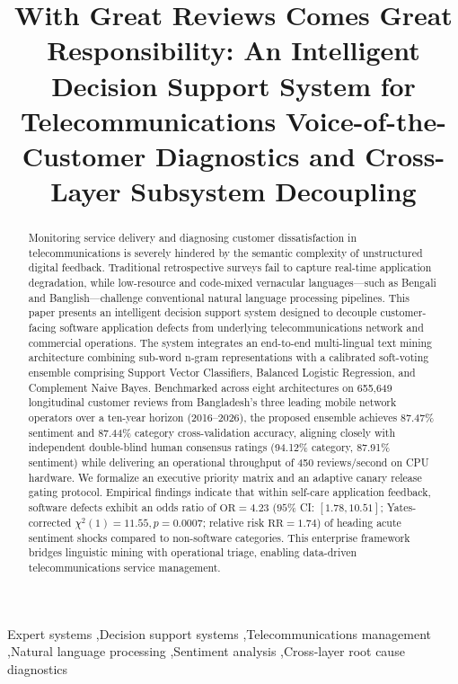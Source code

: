 \documentclass[review,12pt,authoryear]{elsarticle}
\begin{document}
\begin{frontmatter}

\title{With Great Reviews Comes Great Responsibility: An Intelligent Decision Support System for Telecommunications Voice-of-the-Customer Diagnostics and Cross-Layer Subsystem Decoupling}

\begin{abstract}
Monitoring service delivery and diagnosing customer dissatisfaction in telecommunications is severely hindered by the semantic complexity of unstructured digital feedback. Traditional retrospective surveys fail to capture real-time application degradation, while low-resource and code-mixed vernacular languages—such as Bengali and Banglish—challenge conventional natural language processing pipelines. This paper presents an intelligent decision support system designed to decouple customer-facing software application defects from underlying telecommunications network and commercial operations. The system integrates an end-to-end multi-lingual text mining architecture combining sub-word n-gram representations with a calibrated soft-voting ensemble comprising Support Vector Classifiers, Balanced Logistic Regression, and Complement Naive Bayes. Benchmarked across eight architectures on 655,649 longitudinal customer reviews from Bangladesh's three leading mobile network operators over a ten-year horizon (2016--2026), the proposed ensemble achieves 87.47\% sentiment and 87.44\% category cross-validation accuracy, aligning closely with independent double-blind human consensus ratings (94.12\% category, 87.91\% sentiment) while delivering an operational throughput of 450 reviews/second on CPU hardware. We formalize an executive priority matrix and an adaptive canary release gating protocol. Empirical findings indicate that within self-care application feedback, software defects exhibit an odds ratio of $\text{OR} = 4.23$ ($95\%$ CI: $[1.78, 10.51]$; Yates-corrected $\chi^2(1) = 11.55, p = 0.0007$; relative risk $\text{RR} = 1.74$) of heading acute sentiment shocks compared to non-software categories. This enterprise framework bridges linguistic mining with operational triage, enabling data-driven telecommunications service management.
\end{abstract}

\begin{keyword}
Expert systems \sep Decision support systems \sep Telecommunications management \sep Natural language processing \sep Sentiment analysis \sep Cross-layer root cause diagnostics
\end{keyword}

\end{frontmatter}
\end{document}
